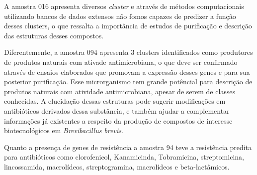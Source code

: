 A amostra 016 apresenta diversos \textit{cluster} e através de métodos computacionais utilizando bancos
de dados extensos não fomos capazes de predizer a função desses clusters, o que ressalta a importância de 
estudos de purificação e descrição das estruturas desses compostos.

Diferentemente, a amostra 094 apresenta 3 clusters identificados como produtores de produtos naturais com
ativade antimicrobiana, o que deve ser confirmado através de ensaios elaborados que promovam a expressão
desses genes e para sua posterior purificação. Esse microrganismo tem grande potêncial para descrição de 
produtos naturais com atividade antimicrobiana, apesar de serem de classes conhecidas. A elucidação dessas
estruturas pode sugerir modificações em antibióticos derivados dessa substância, e também ajudar a complementar
informações já existentes a respeito da produção de compostos de interesse biotecnológicos em \textit{Brevibacillus brevis}.

Quanto a presença de genes de resistência a amostra 94 teve a resistência predita para antibióticos como clorofenicol,
Kanamicinda, Tobramicina, streptomicina, lincossamida, macrolídeos, streptogramina, macrolídeos e beta-lactâmicos. 

